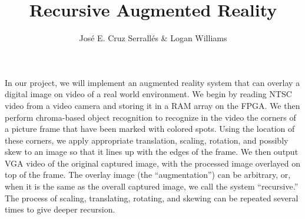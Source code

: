 \documentclass[12pt]{amsart}
\title{Recursive Augmented Reality}
\author{Jos\'{e} E. Cruz Serrall\'{e}s \& Logan Williams}
\date{}
\begin{document}
\maketitle

In our project, we will implement an augmented reality system that can overlay a digital image on video of a real world environment. We begin by reading NTSC video from a video camera and storing it in a RAM array on the FPGA. We then perform chroma-based object recognition to recognize in the video the corners of a picture frame that have been marked with colored spots. Using the location of these corners, we apply appropriate translation, scaling, rotation, and possibly skew to an image so that it lines up with the edges of the frame. We then output VGA video of the original captured image, with the processed image overlayed on top of the frame. The overlay image (the ``augmentation'') can be arbitrary, or, when it is the same as the overall captured image, we call the system ``recursive.'' The process of scaling, translating, rotating, and skewing can be repeated several times to give deeper recursion.
\end{document}
